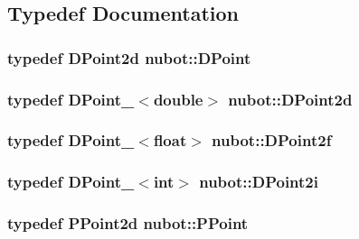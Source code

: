 \subsection{Typedef Documentation}
\hypertarget{namespacenubot_aa018cd283eed6867313e025b8274d7cb}{
\subsubsection[{D\-Point}]{\setlength{\rightskip}{0pt plus 5cm}typedef {\bf D\-Point2d} {\bf nubot\-::\-D\-Point}}}\label{namespacenubot_aa018cd283eed6867313e025b8274d7cb}
\hypertarget{namespacenubot_ab9fab4518d012a39668ef9243a79592d}{
\subsubsection[{D\-Point2d}]{\setlength{\rightskip}{0pt plus 5cm}typedef {\bf D\-Point\-\_\-}$<$double$>$ {\bf nubot\-::\-D\-Point2d}}}\label{namespacenubot_ab9fab4518d012a39668ef9243a79592d}
\hypertarget{namespacenubot_a6be33a8f735ad395ebcd6406ac569f6c}{
\subsubsection[{D\-Point2f}]{\setlength{\rightskip}{0pt plus 5cm}typedef {\bf D\-Point\-\_\-}$<$float$>$ {\bf nubot\-::\-D\-Point2f}}}\label{namespacenubot_a6be33a8f735ad395ebcd6406ac569f6c}
\hypertarget{namespacenubot_ae69184d9b1bffbfbf9d691878fdab937}{
\subsubsection[{D\-Point2i}]{\setlength{\rightskip}{0pt plus 5cm}typedef {\bf D\-Point\-\_\-}$<$int$>$ {\bf nubot\-::\-D\-Point2i}}}\label{namespacenubot_ae69184d9b1bffbfbf9d691878fdab937}
\hypertarget{namespacenubot_a8f62d6210d4a62013af1a40cd5f39de2}{
\subsubsection[{P\-Point}]{\setlength{\rightskip}{0pt plus 5cm}typedef {\bf P\-Point2d} {\bf nubot\-::\-P\-Point}}}\label{namespacenubot_a8f62d6210d4a62013af1a40cd5f39de2}
